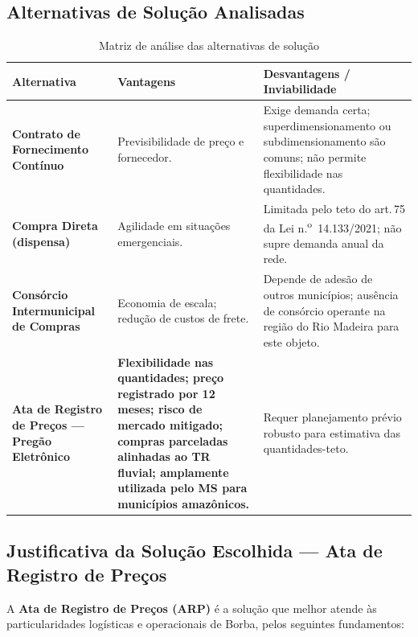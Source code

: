 \documentclass[12pt,a4paper]{article}
\newcommand{\art}[1]{art.\,#1}
\begin{document}
\subsection{Alternativas de Solução Analisadas}

\begin{table}[H]
\centering
\caption{Matriz de análise das alternativas de solução}
\label{tab:alternativas}
\small{}
\begin{tabular}{>{\bfseries}p{3.5cm}p{4.8cm}p{5.0cm}}
  \rowcolor{navyblue}
  \color{white}\textbf{Alternativa} &
  \color{white}\textbf{Vantagens} &
  \color{white}\textbf{Desvantagens / Inviabilidade} \\
  \toprule
  Contrato de Fornecimento Contínuo &
    Previsibilidade de preço e fornecedor. &
    Exige demanda certa; superdimensionamento ou subdimensionamento são comuns;
    não permite flexibilidade nas quantidades. \\
  Compra Direta (dispensa) &
    Agilidade em situações emergenciais. &
    Limitada pelo teto do \art{75} da Lei n.\textsuperscript{o}~14.133/2021;
    não supre demanda anual da rede. \\
  Consórcio Intermunicipal de Compras &
    Economia de escala; redução de custos de frete. &
    Depende de adesão de outros municípios; ausência de consórcio
    operante na região do Rio Madeira para este objeto. \\
  \rowcolor{lightblue}
  \textbf{Ata de Registro de Preços --- Pregão Eletrônico} &
    \textbf{Flexibilidade nas quantidades; preço registrado por 12 meses;
    risco de mercado mitigado; compras parceladas alinhadas ao TR fluvial;
    amplamente utilizada pelo MS para municípios amazônicos.} &
    Requer planejamento prévio robusto para estimativa das quantidades-teto. \\
  \bottomrule
\end{tabular}
\end{table}

\subsection{Justificativa da Solução Escolhida --- Ata de Registro de Preços}

A \textbf{Ata de Registro de Preços (ARP)} é a solução que melhor atende às
particularidades logísticas e operacionais de Borba, pelos seguintes fundamentos:
\end{document}
